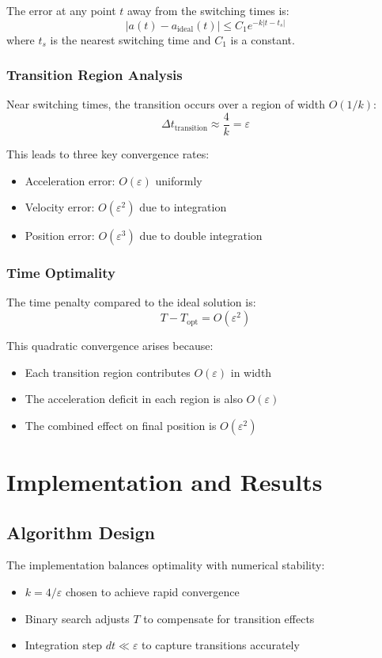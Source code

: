 \documentclass[12pt,a4paper]{article}
\begin{document}
The error at any point $t$ away from the switching times is:
\begin{equation}
|a(t) - a_{\text{ideal}}(t)| \leq C_1 e^{-k|t-t_s|}
\end{equation}
where $t_s$ is the nearest switching time and $C_1$ is a constant.

\subsubsection{Transition Region Analysis}
Near switching times, the transition occurs over a region of width $O(1/k)$:
\begin{equation}
\Delta t_{\text{transition}} \approx \frac{4}{k} = \varepsilon
\end{equation}

This leads to three key convergence rates:
\begin{itemize}
\item Acceleration error: $O(\varepsilon)$ uniformly
\item Velocity error: $O(\varepsilon^2)$ due to integration
\item Position error: $O(\varepsilon^3)$ due to double integration
\end{itemize}

\subsubsection{Time Optimality}
The time penalty compared to the ideal solution is:
\begin{equation}
T - T_{\text{opt}} = O(\varepsilon^2)
\end{equation}

This quadratic convergence arises because:
\begin{itemize}
\item Each transition region contributes $O(\varepsilon)$ in width
\item The acceleration deficit in each region is also $O(\varepsilon)$
\item The combined effect on final position is $O(\varepsilon^2)$
\end{itemize}

\section{Implementation and Results}

\subsection{Algorithm Design}
The implementation balances optimality with numerical stability:
\begin{itemize}
\item $k = 4/\varepsilon$ chosen to achieve rapid convergence
\item Binary search adjusts $T$ to compensate for transition effects
\item Integration step $dt \ll \varepsilon$ to capture transitions accurately
\end{itemize}
\end{document}
